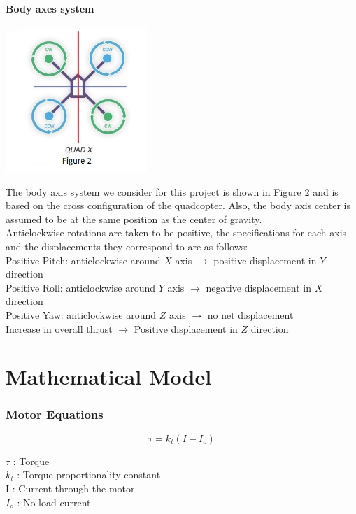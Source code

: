 \documentclass[9pt]{article}
\begin{document}
\subsection{Body axes system}

\begin{center}
\includegraphics[width=0.4\textwidth]{2.jpg}
\end{center}

\noindent The body axis system we consider for this project is shown in Figure $2$ and is based on the cross configuration of the quadcopter. Also, the body axis center is assumed to be at the same position as the center of gravity.\\
Anticlockwise rotations are taken to be positive, the specifications for each axis and the displacements they correspond to are as follows:\\
Positive Pitch:	anticlockwise around $X$ axis $\rightarrow$ positive displacement in $Y$ direction\\
Positive Roll: anticlockwise around $Y$ axis $\rightarrow$ negative displacement in $X$ direction\\
Positive Yaw: anticlockwise around $Z$ axis $\rightarrow$ no net displacement\\
Increase in overall thrust $\rightarrow$ Positive displacement in $Z$ direction

\part{Mathematical Model}

\section{Motor Equations}

\begin{equation}
\tau = k_{t}(I-I_{o})
\end{equation}

\noindent $\tau$ : Torque\\
$k_{t}$	 : Torque proportionality constant\\ 
\noindent I	 : Current through the motor\\ 
$I_{o}$	 : No load current\\
		
\end{document}
